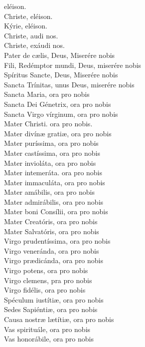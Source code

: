 eléison.\\
Christe, eléison.\\
Kýrie, eléison.\\
Christe, audi nos.\\
Christe, exáudi nos.\\
Pater de c{\ae}lis, Deus, Miserére nobis\\
Fili, Redémptor mundi, Deus, miserére nobis\\
Spíritus Sancte, Deus, Miserére nobis\\
Sancta Trínitas, unus Deus, miserére nobis\\
Sancta Maria, ora pro nobis\\
Sancta Dei Génetrix, ora pro nobis\\
Sancta Virgo vírginum, ora pro nobis\\
Mater Christi. ora pro nobis.\\
Mater divín{\ae} grati{\ae}, ora pro nobis\\
Mater puríssima, ora pro nobis\\
Mater castíssima, ora pro nobis\\
Mater invioláta, ora pro nobis\\
Mater intemeráta. ora pro nobis\\
Mater immaculáta, ora pro nobis\\
Mater amábilis, ora pro nobis\\
Mater admirábilis, ora pro nobis\\
Mater boni Consílii, ora pro nobis\\
Mater Creatóris, ora pro nobis\\
Mater Salvatóris, ora pro nobis\\
Virgo prudentíssima, ora pro nobis\\
Virgo veneránda, ora pro nobis\\
Virgo pr{\ae}dicánda, ora pro nobis\\
Virgo potens, ora pro nobis\\
Virgo clemens, pra pro nobis\\
Virgo fidélis, ora pro nobis\\
Spéculum iustíti{\ae}, ora pro nobis\\
Sedes Sapiénti{\ae}, ora pro nobis\\
Causa nostr{\ae} l{\ae}títi{\ae}, ora pro nobis\\
Vas spirituále, ora pro nobis\\
Vas honorábile, ora pro nobis\\
